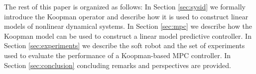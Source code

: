The rest of this paper is organized as follows:
In Section \ref{sec:sysid} we formally introduce the Koopman operator and describe how it is used to construct linear models of nonlinear dynamical systems. 
In Section \ref{sec:mpc} we describe how the Koopman model can be used to construct a linear model predictive controller.
In Section \ref{sec:experiments} we describe the soft robot and the set of experiments used to evaluate the performance of a Koopman-based MPC controller.
In Section \ref{sec:conclusion} concluding remarks and perspectives are provided.






